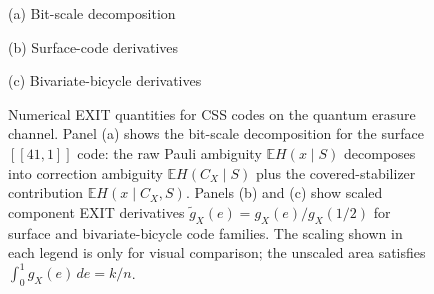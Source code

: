 \begin{figure}[t]
\centering
\begin{minipage}[t]{0.315\textwidth}
\centering

{\footnotesize (a) Bit-scale decomposition}
\end{minipage}\hfill
\begin{minipage}[t]{0.315\textwidth}
\centering

{\footnotesize (b) Surface-code derivatives}
\end{minipage}\hfill
\begin{minipage}[t]{0.315\textwidth}
\centering

{\footnotesize (c) Bivariate-bicycle derivatives}
\end{minipage}
\caption{Numerical EXIT quantities for CSS codes on the quantum erasure
channel.  Panel (a) shows the bit-scale decomposition for the surface
$[[41,1]]$ code: the raw Pauli ambiguity $\mathbb{E}H(x\mid S)$ decomposes
into correction ambiguity $\mathbb{E}H(C_X\mid S)$ plus the covered-stabilizer
contribution $\mathbb{E}H(x\mid C_X,S)$.  Panels (b) and (c) show scaled
component EXIT derivatives
$\widetilde g_X(e)=g_X(e)/g_X(1/2)$ for surface and bivariate-bicycle code
families.  The scaling shown in each legend is only for visual comparison; the
unscaled area satisfies $\int_0^1 g_X(e)\,de=k/n$.}
\label{fig:scaled-exit-numerics}
\end{figure}
